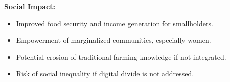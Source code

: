 \begin{answer}
\begin{enumerate}
\textbf{Social Impact:}
\begin{itemize}
  \item Improved food security and income generation for smallholders.
  \item Empowerment of marginalized communities, especially women.
  \item Potential erosion of traditional farming knowledge if not integrated.
  \item Risk of social inequality if digital divide is not addressed.
\end{itemize}
\end{enumerate}
\end{answer}
